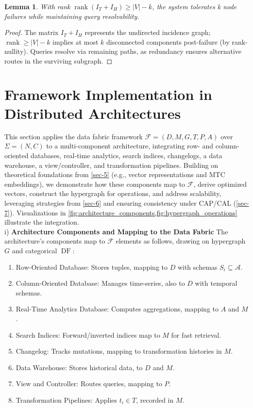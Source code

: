 \documentclass{amsart}
\newtheorem{lem}{Lemma}
\newcommand\cF{\mathcal{F}}
\DeclareMathOperator\DF{DF}
\DeclareMathOperator\rank{rank}
\begin{document}
\begin{lem} \label{lem:fault_redundancy}
With rank \( \rank(I_T + I_H) \geq |V| - k \), the system tolerates k node failures while maintaining query resolvability.
\end{lem}

\begin{proof}
The matrix \( I_T + I_H \) represents the undirected incidence graph; $\rank \geq |V| - k$  implies at most $k$ disconnected components post-failure (by rank-nullity). Queries resolve via remaining paths, as redundancy ensures alternative routes in the surviving subgraph.
\end{proof}

\section{Framework Implementation in Distributed Architectures} \label{sec-8}

This section applies the data fabric framework \( \cF = (D, M, G, T, P, A) \) over \( \Sigma = (N, C) \) to a multi-component architecture, integrating row- and column-oriented databases, real-time analytics, search indices, changelogs, a data warehouse, a view/controller, and transformation pipelines. Building on theoretical foundations from \cref{sec-5} (e.g., vector representations and MTC embeddings), we demonstrate how these components map to \( \cF \), derive optimized vectors, construct the hypergraph for operations, and address scalability, leveraging strategies from \cref{sec-6} and ensuring consistency under CAP/CAL (\cref{sec-7}). Visualizations in \cref{fig:architecture_components,fig:hypergraph_operations} illustrate the integration. \\

i) \textbf{Architecture Components and Mapping to the Data Fabric} \label{subsec:architecture_components}
The architecture's components map to \( \cF \) elements as follows, drawing on hypergraph \( G \) and categorical \( \DF \):

\begin{enumerate}
    \item Row-Oriented Database: Stores tuples, mapping to \( D \) with schemas \( S_i \subseteq \mathcal{A} \).
    \item Column-Oriented Database: Manages time-series, also to \( D \) with temporal schemas.
    \item Real-Time Analytics Database: Computes aggregations, mapping to \( A \) and \( M \).
    \item Search Indices: Forward/inverted indices map to \( M \) for fast retrieval.
    \item Changelog: Tracks mutations, mapping to transformation histories in \( M \).
    \item Data Warehouse: Stores historical data, to \( D \) and \( M \).
    \item View and Controller: Routes queries, mapping to \( P \).
    \item Transformation Pipelines: Applies \( t_i \in T \), recorded in \( M \).
\end{enumerate}
\end{document}

